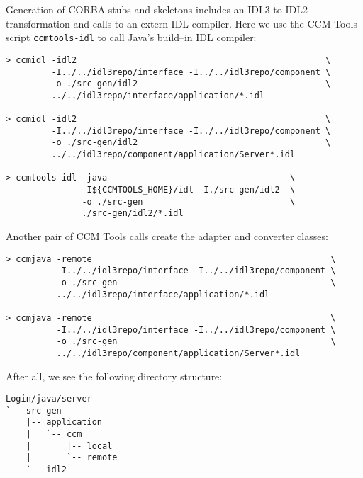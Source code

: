 \vspace{3mm}
Generation of CORBA stubs and skeletons includes an IDL3 to IDL2 transformation
and calls to an extern IDL compiler. Here we use the CCM Tools script {\tt ccmtools-idl}
to call Java's build--in IDL compiler:
\begin{footnotesize}
\begin{verbatim}
> ccmidl -idl2                                                 \
         -I../../idl3repo/interface -I../../idl3repo/component \ 
         -o ./src-gen/idl2                                     \
         ../../idl3repo/interface/application/*.idl

> ccmidl -idl2                                                 \ 
         -I../../idl3repo/interface -I../../idl3repo/component \
         -o ./src-gen/idl2                                     \
         ../../idl3repo/component/application/Server*.idl

> ccmtools-idl -java                                    \
               -I${CCMTOOLS_HOME}/idl -I./src-gen/idl2  \ 
               -o ./src-gen                             \
               ./src-gen/idl2/*.idl
\end{verbatim}
\end{footnotesize}

Another pair of CCM Tools calls create the adapter and converter classes:
\begin{footnotesize}
\begin{verbatim}
> ccmjava -remote                                               \
          -I../../idl3repo/interface -I../../idl3repo/component \
          -o ./src-gen                                          \
          ../../idl3repo/interface/application/*.idl 

> ccmjava -remote                                               \
          -I../../idl3repo/interface -I../../idl3repo/component \ 
          -o ./src-gen                                          \
          ../../idl3repo/component/application/Server*.idl
\end{verbatim}
\end{footnotesize}

After all, we see the following directory structure: 
\begin{footnotesize}
\begin{verbatim}
Login/java/server
`-- src-gen
    |-- application
    |   `-- ccm
    |       |-- local
    |       `-- remote
    `-- idl2
\end{verbatim}
\end{footnotesize}

